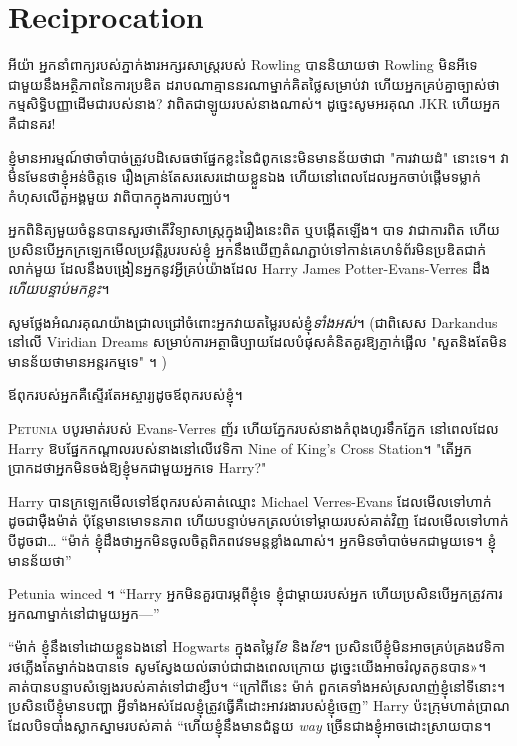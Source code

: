 \chapter{Reciprocation}

\begin{chapterOpeningAuthorNote}
អីយ៉ា អ្នកនាំពាក្យរបស់ភ្នាក់ងារអក្សរសាស្ត្ររបស់ Rowling បាននិយាយថា Rowling មិនអីទេជាមួយនឹងអត្ថិភាពនៃការប្រឌិត ដរាបណាគ្មាននរណាម្នាក់គិតថ្លៃសម្រាប់វា ហើយអ្នកគ្រប់គ្នាច្បាស់ថាកម្មសិទ្ធិបញ្ញាដើមជារបស់នាង? វាពិតជាឡូយរបស់នាងណាស់។ ដូច្នេះសូមអរគុណ JKR ហើយអ្នកគឺជានគរ!

ខ្ញុំមានអារម្មណ៍ថាចាំបាច់ត្រូវបដិសេធថាផ្នែកខ្លះនៃជំពូកនេះមិនមានន័យថាជា "ការវាយដំ" នោះទេ។ វាមិនមែនថាខ្ញុំអន់ចិត្តទេ រឿងគ្រាន់តែសរសេរដោយខ្លួនឯង ហើយនៅពេលដែលអ្នកចាប់ផ្តើមទម្លាក់កំហុសលើតួអង្គមួយ វាពិបាកក្នុងការបញ្ឈប់។

អ្នកពិនិត្យមួយចំនួនបានសួរថាតើវិទ្យាសាស្ត្រក្នុងរឿងនេះពិត ឬបង្កើតឡើង។ បាទ វាជាការពិត ហើយប្រសិនបើអ្នកក្រឡេកមើលប្រវត្តិរូបរបស់ខ្ញុំ អ្នកនឹងឃើញតំណភ្ជាប់ទៅកាន់គេហទំព័រមិនប្រឌិតជាក់លាក់មួយ ដែលនឹងបង្រៀនអ្នកនូវអ្វីគ្រប់យ៉ាងដែល Harry James Potter-Evans-Verres ដឹង \emph{ហើយបន្ទាប់មកខ្លះ}។

សូមថ្លែងអំណរគុណយ៉ាងជ្រាលជ្រៅចំពោះអ្នកវាយតម្លៃរបស់ខ្ញុំ\emph{ទាំងអស់}។ (ជាពិសេស Darkandus នៅលើ Viridian Dreams សម្រាប់ការអត្ថាធិប្បាយដែលបំផុសគំនិតគួរឱ្យភ្ញាក់ផ្អើល "សួតនិងតែមិនមានន័យថាមានអន្តរកម្មទេ" ។ )
\end{chapterOpeningAuthorNote}
\begin{chapterOpeningQuote}
ឪពុក​របស់​អ្នក​គឺ​ស្ទើរតែ​អស្ចារ្យ​ដូច​ឪពុក​របស់ខ្ញុំ​។
\end{chapterOpeningQuote}

\lettrine{P}{etunia} បបូរមាត់របស់ Evans-Verres ញ័រ ហើយភ្នែករបស់នាងកំពុងហូរទឹកភ្នែក នៅពេលដែល Harry ឱបផ្នែកកណ្តាលរបស់នាងនៅលើវេទិកា Nine of King's Cross Station។ "តើអ្នកប្រាកដថាអ្នកមិនចង់ឱ្យខ្ញុំមកជាមួយអ្នកទេ Harry?"

Harry បានក្រឡេកមើលទៅឪពុករបស់គាត់ឈ្មោះ Michael Verres-Evans ដែលមើលទៅហាក់ដូចជាម៉ឺងម៉ាត់ ប៉ុន្តែមានមោទនភាព ហើយបន្ទាប់មកត្រលប់ទៅម្តាយរបស់គាត់វិញ ដែលមើលទៅហាក់បីដូចជា… “ម៉ាក់ ខ្ញុំដឹងថាអ្នកមិនចូលចិត្តពិភពវេទមន្តខ្លាំងណាស់។ អ្នកមិនចាំបាច់មកជាមួយទេ។ ខ្ញុំមានន័យថា”

Petunia winced ។ “Harry អ្នក​មិន​គួរ​បារម្ភ​ពី​ខ្ញុំ​ទេ ខ្ញុំ​ជា​ម្តាយ​របស់​អ្នក ហើយ​ប្រសិន​បើ​អ្នក​ត្រូវ​ការ​អ្នក​ណា​ម្នាក់​នៅ​ជាមួយ​អ្នក—”

“ម៉ាក់ ខ្ញុំនឹងទៅដោយខ្លួនឯងនៅ Hogwarts ក្នុងតម្លៃ\emph{ខែ} និង\emph{ខែ}។ ប្រសិន​បើ​ខ្ញុំ​មិន​អាច​គ្រប់​គ្រង​វេទិកា​រថ​ភ្លើង​តែ​ម្នាក់​ឯង​បាន​ទេ សូម​ស្វែង​យល់​ឆាប់​ជា​ជាង​ពេល​ក្រោយ ដូច្នេះ​យើង​អាច​រំលូត​កូន​បាន»។ គាត់បានបន្ទាបសំឡេងរបស់គាត់ទៅជាខ្សឹប។ “ក្រៅពីនេះ ម៉ាក់ ពួកគេទាំងអស់ស្រលាញ់ខ្ញុំនៅទីនោះ។ ប្រសិនបើខ្ញុំមានបញ្ហា អ្វីទាំងអស់ដែលខ្ញុំត្រូវធ្វើគឺដោះអាវរងារបស់ខ្ញុំចេញ” Harry ប៉ះក្រុមហាត់ប្រាណដែលបិទបាំងស្លាកស្នាមរបស់គាត់ “ហើយខ្ញុំនឹងមានជំនួយ \emph{way} ច្រើនជាងខ្ញុំអាចដោះស្រាយបាន។

